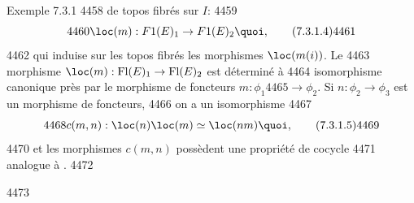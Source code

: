 \begin{enonce*}[remark]{Exemple 7.3.1}
  4458	de topos fibrés sur $I$:
  4459	\begin{equation*}
  4460	\loc(m) : F1(E)_1 \to F1 (E)_2{\quoi},\tag{7.3.1.4}
  4461	\end{equation*}
  4462	qui induise sur les topos fibrés les morphismes $\loc(m(i))$.  Le
  4463	morphisme $\loc(m) : \text{Fl}(E)_1 \to \text{Fl} (E)_2$ est déterminé à
  4464	isomorphisme canonique près par le morphisme de foncteurs $m : \phi_1
  4465	\to \phi_2$. Si $n : \phi_2 \to \phi_3$ est un morphisme de foncteurs,
  4466	on a un isomorphisme
  4467	\begin{equation*}
  4468	c(m, n) : \loc (n) \loc(m) \simeq \loc(nm){\quoi},\tag{7.3.1.5}
  4469	\end{equation*}
  4470	et les morphismes $c(m, n)$ possèdent une propriété de cocycle
  4471	analogue à .
  4472	\end{enonce*}
  4473	
